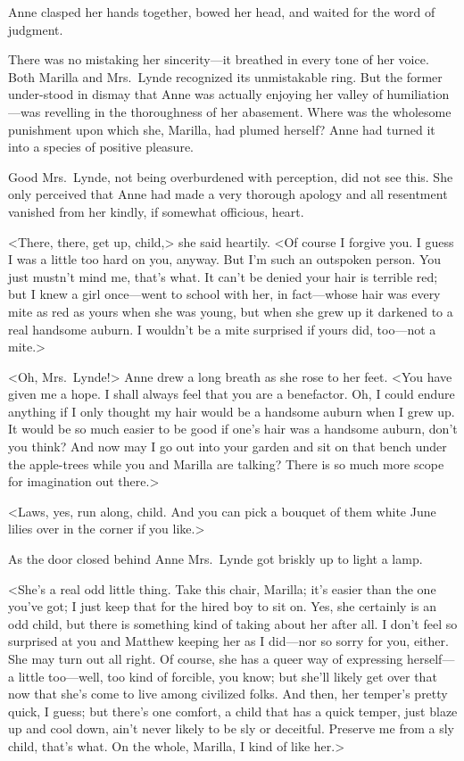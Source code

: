 Anne clasped her hands together, bowed her head, and waited for the word of judgment.

There was no mistaking her sincerity—it breathed in every tone of her voice. Both Marilla and Mrs.~Lynde recognized its unmistakable ring. But the former under-stood in dismay that Anne was actually enjoying her valley of humiliation—was revelling in the thoroughness of her abasement. Where was the wholesome punishment upon which she, Marilla, had plumed herself? Anne had turned it into a species of positive pleasure.

Good Mrs.~Lynde, not being overburdened with perception, did not see this. She only perceived that Anne had made a very thorough apology and all resentment vanished from her kindly, if somewhat officious, heart.

<There, there, get up, child,> she said heartily. <Of course I forgive you. I guess I was a little too hard on you, anyway. But I'm such an outspoken person. You just mustn't mind me, that's what. It can't be denied your hair is terrible red; but I knew a girl once—went to school with her, in fact—whose hair was every mite as red as yours when she was young, but when she grew up it darkened to a real handsome auburn. I wouldn't be a mite surprised if yours did, too—not a mite.>

<Oh, Mrs.~Lynde!> Anne drew a long breath as she rose to her feet. <You have given me a hope. I shall always feel that you are a benefactor. Oh, I could endure anything if I only thought my hair would be a handsome auburn when I grew up. It would be so much easier to be good if one's hair was a handsome auburn, don't you think? And now may I go out into your garden and sit on that bench under the apple-trees while you and Marilla are talking? There is so much more scope for imagination out there.>

<Laws, yes, run along, child. And you can pick a bouquet of them white June lilies over in the corner if you like.>

As the door closed behind Anne Mrs.~Lynde got briskly up to light a lamp.

<She's a real odd little thing. Take this chair, Marilla; it's easier than the one you've got; I just keep that for the hired boy to sit on. Yes, she certainly is an odd child, but there is something kind of taking about her after all. I don't feel so surprised at you and Matthew keeping her as I did—nor so sorry for you, either. She may turn out all right. Of course, she has a queer way of expressing herself—a little too—well, too kind of forcible, you know; but she'll likely get over that now that she's come to live among civilized folks. And then, her temper's pretty quick, I guess; but there's one comfort, a child that has a quick temper, just blaze up and cool down, ain't never likely to be sly or deceitful. Preserve me from a sly child, that's what. On the whole, Marilla, I kind of like her.>

